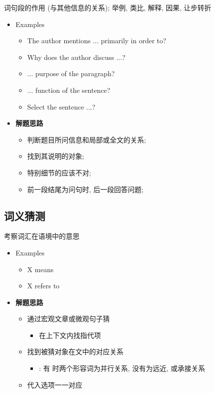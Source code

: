     词句段的作用 (与其他信息的关系); 举例, 类比, 解释, 因果, 让步转折

    \begin{itemize}
      \item Examples
      \begin{itemize}
        \item The author mentions ... primarily in order to?
        \item Why does the author discuss ...?
        \item ... purpose of the paragraph?
        \item ... function of the sentence?
        \item Select the sentence ...?
      \end{itemize}

      \item \textbf{解题思路}
      \begin{itemize}
        \item 判断题目所问信息和局部或全文的关系;
        \item 找到其说明的对象;
        \item 特别细节的应该不对;
        \item 前一段结尾为问句时, 后一段回答问题;
      \end{itemize}
    \end{itemize}

  \subsection{词义猜测}

    考察词汇在语境中的意思

    \begin{itemize}
      \item Examples
      \begin{itemize}
        \item X means
        \item X refers to
      \end{itemize}

      \item \textbf{解题思路}
      \begin{itemize}
        \item 通过宏观文章或微观句子猜
        \begin{itemize}
          \item 在上下文内找指代项
        \end{itemize}

        \item 找到被猜对象在文中的对应关系
        \begin{itemize}
          \item {}: 有 \say{,} 时两个形容词为并行关系,
          没有为远近, 或承接关系
        \end{itemize}

        \item 代入选项一一对应
      \end{itemize}
    \end{itemize}

